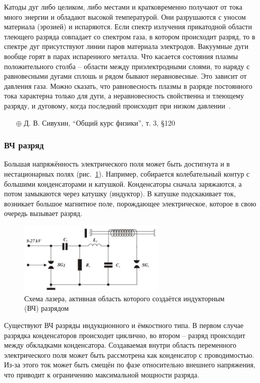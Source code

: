 \documentclass[10pt, a4paper]{article}
\begin{document}
Катоды дуг либо целиком, либо местами и кратковременно получают от тока много энергии и обладают высокой температурой. Они разрушаются с уносом материала (эрозией) и испаряются. Если спектр излучения прикатодной области тлеющего разряда совпадает со спектром газа, в котором происходит разряд, то в спектре дуг присутствуют линии паров материала электродов. Вакуумные дуги вообще горят в парах испаренного металла. Что касается состояния плазмы положительного столба -- области между приэлектродными слоями, то наряду с равновесными дугами сплошь и рядом бывают неравновесные. Это зависит от давления газа. Можно сказать, что равновесность плазмы в разряде постоянного тока характерна только для дуги, а неравновесность свойственна и тлеющему разряду, и дуговому, когда последний происходит при низком давлении~\cite{raizer}.

\begin{itemize}
	\item[$\oplus$] Д. В. Сивухин, ``Общий курс физики'', т. 3, \S 120
\end{itemize}

\subsubsection{ВЧ разряд}

Большая напряжённость электрического поля может быть достигнута и в нестационарных полях (рис.~\ref{fig:RF_dicharge}). Например, собирается колебательный контур с большими конденсаторами и катушкой. Конденсаторы сначала заряжаются, а потом замыкаются через катушку (индуктор). В катушке подскакивает ток, возникает большое магнитное поле, порождающее электрическое, которое в свою очередь вызывает разряд.

\begin{figure}[ht]
	\begin{center}
		\includegraphics[width=70mm]{12.5.jpg}
	\end{center}
	\caption{Схема лазера, активная область которого создаётся индукторным (ВЧ) разрядом}
	\label{fig:RF_dicharge}
\end{figure}

Существуют ВЧ разряды индукционного и ёмкостного типа. В первом случае разрядка конденсаторов происходит циклично, во втором -- разряд происходит между обкладками конденсатора. Создаваемая внутри область переменного электрического поля может быть рассмотрена как конденсатор с проводимостью. Из-за этого ток может быть смещён по фазе относительно внешнего напряжения, что приводит к ограничению максимальной мощности разряда.
\end{document}
